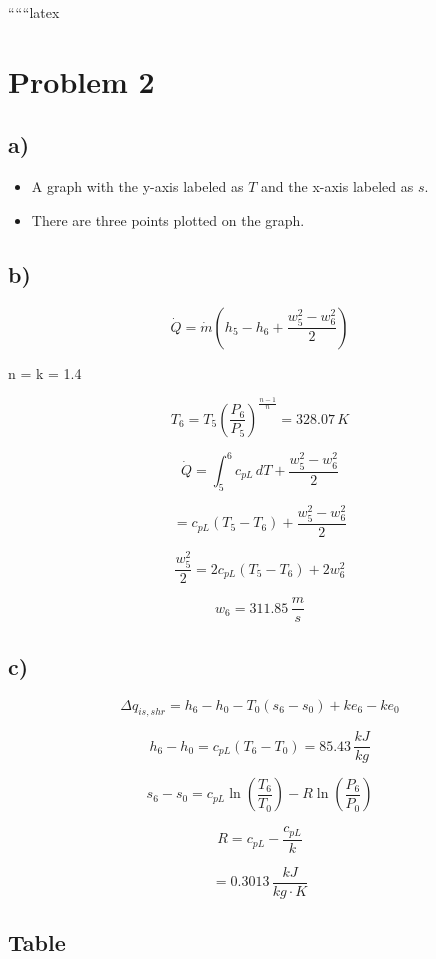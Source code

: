 
``````latex


\section*{Problem 2}

\subsection*{a)}

\begin{itemize}
    \item A graph with the y-axis labeled as $T$ and the x-axis labeled as $s$.
    \item There are three points plotted on the graph.
\end{itemize}

\subsection*{b)}

\[
\dot{Q} = \dot{m}(h_5 - h_6 + \frac{w_5^2 - w_6^2}{2})
\]

 \Rightarrow n = k = 1.4

\[
T_6 = T_5 \left( \frac{P_6}{P_5} \right)^{\frac{n-1}{n}} = 328.07 \, K
\]

\[
\dot{Q} = \int_{5}^{6} c_{pL} \, dT + \frac{w_5^2 - w_6^2}{2}
\]

\[
= c_{pL}(T_5 - T_6) + \frac{w_5^2 - w_6^2}{2}
\]

\[
\frac{w_5^2}{2} = 2 c_{pL}(T_5 - T_6) + 2 w_6^2
\]

\[
w_6 = 311.85 \, \frac{m}{s}
\]

\subsection*{c)}

\[
\Delta q_{is,shr} = h_6 - h_0 - T_0(s_6 - s_0) + k e_6 - k e_0
\]

\[
h_6 - h_0 = c_{pL}(T_6 - T_0) = 85.43 \, \frac{kJ}{kg}
\]

\[
s_6 - s_0 = c_{pL} \ln \left( \frac{T_6}{T_0} \right) - R \ln \left( \frac{P_6}{P_0} \right)
\]

\[
R = c_{pL} - \frac{c_{pL}}{k}
\]

\[
= 0.3013 \, \frac{kJ}{kg \cdot K}
\]

\subsection*{Table}

